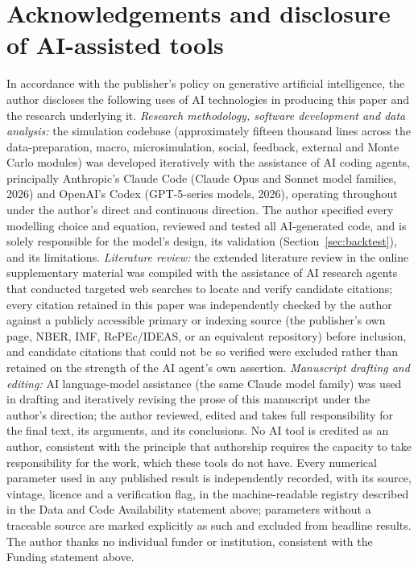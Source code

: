 \documentclass[11pt,a4paper]{article}
\begin{document}
\section*{Acknowledgements and disclosure of AI-assisted tools}
In accordance with the publisher's policy on generative artificial intelligence, the author discloses the following uses of AI technologies in producing this paper and the research underlying it. \emph{Research methodology, software development and data analysis:} the simulation codebase (approximately fifteen thousand lines across the data-preparation, macro, microsimulation, social, feedback, external and Monte Carlo modules) was developed iteratively with the assistance of AI coding agents, principally Anthropic's Claude Code (Claude Opus and Sonnet model families, 2026) and OpenAI's Codex (GPT-5-series models, 2026), operating throughout under the author's direct and continuous direction. The author specified every modelling choice and equation, reviewed and tested all AI-generated code, and is solely responsible for the model's design, its validation (Section~\ref{sec:backtest}), and its limitations. \emph{Literature review:} the extended literature review in the online supplementary material was compiled with the assistance of AI research agents that conducted targeted web searches to locate and verify candidate citations; every citation retained in this paper was independently checked by the author against a publicly accessible primary or indexing source (the publisher's own page, NBER, IMF, RePEc/IDEAS, or an equivalent repository) before inclusion, and candidate citations that could not be so verified were excluded rather than retained on the strength of the AI agent's own assertion. \emph{Manuscript drafting and editing:} AI language-model assistance (the same Claude model family) was used in drafting and iteratively revising the prose of this manuscript under the author's direction; the author reviewed, edited and takes full responsibility for the final text, its arguments, and its conclusions. No AI tool is credited as an author, consistent with the principle that authorship requires the capacity to take responsibility for the work, which these tools do not have. Every numerical parameter used in any published result is independently recorded, with its source, vintage, licence and a verification flag, in the machine-readable registry described in the Data and Code Availability statement above; parameters without a traceable source are marked explicitly as such and excluded from headline results. The author thanks no individual funder or institution, consistent with the Funding statement above.
\end{document}
